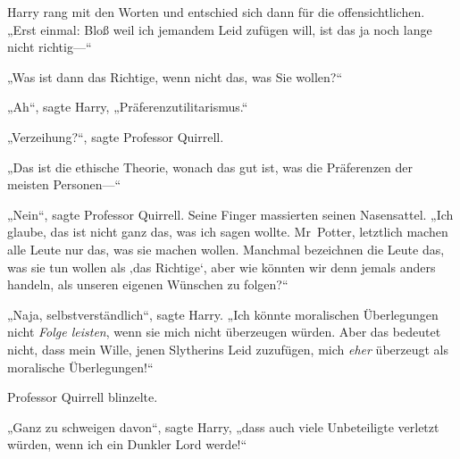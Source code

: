 Harry rang mit den Worten und entschied sich dann für die offensichtlichen. „Erst einmal: Bloß weil ich jemandem Leid zufügen will, ist das ja noch lange nicht richtig—“

„Was ist dann das Richtige, wenn nicht das, was Sie wollen?“

„Ah“, sagte Harry, „Präferenzutilitarismus.“

„Verzeihung?“, sagte Professor Quirrell.

„Das ist die ethische Theorie, wonach das gut ist, was die Präferenzen der meisten Personen—“

„Nein“, sagte Professor Quirrell. Seine Finger massierten seinen Nasensattel. „Ich glaube, das ist nicht ganz das, was ich sagen wollte. Mr~Potter, letztlich machen alle Leute nur das, was sie machen wollen. Manchmal bezeichnen die Leute das, was sie tun wollen als ‚das Richtige‘, aber wie könnten wir denn jemals anders handeln, als unseren eigenen Wünschen zu folgen?“

„Naja, selbstverständlich“, sagte Harry. „Ich könnte moralischen Überlegungen nicht \emph{Folge leisten}, wenn sie mich nicht überzeugen würden. Aber das bedeutet nicht, dass mein Wille, jenen Slytherins Leid zuzufügen, mich \emph{eher} überzeugt als moralische Überlegungen!“

Professor Quirrell blinzelte.

„Ganz zu schweigen davon“, sagte Harry, „dass auch viele Unbeteiligte verletzt würden, wenn ich ein Dunkler Lord werde!“

